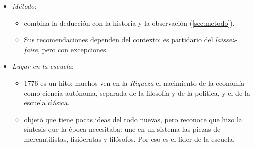 \documentclass[11pt]{article}
\begin{document}
\begin{itemize}
\begin{itemize}
  \item \emph{An Inquiry into the Nature and Causes of the Wealth of Nations}\nocite{Smith1776Wealth}, en 5~libros: el 1.º, sobre la división del trabajo, el valor y el reparto; el 2.º, sobre el capital; el 3.º, sobre la historia del progreso de la riqueza; el 4.º, sobre la crítica del mercantilismo y de los fisiócratas, y el 5.º, sobre las finanzas del Estado.
  \end{itemize}
\item \emph{Método}:
  \begin{itemize}
  \item {} combina la deducción con la historia y la observación (\ref{sec:metodo}).
  \item Sus recomendaciones dependen del contexto: es partidario del \emph{laissez-faire}, pero con excepciones.
  \end{itemize}
\item \emph{Lugar en la escuela}:
  \begin{itemize}
  \item 1776 es un hito: muchos ven en la \emph{Riqueza} el nacimiento de la economía como ciencia autónoma, separada de la filosofía y de la política, y el de la escuela clásica.
  \item {} objetó que tiene pocas ideas del todo nuevas, pero reconoce que hizo la síntesis que la época necesitaba: une en un sistema las piezas de mercantilistas, fisiócratas y filósofos\nocite{Schumpeter1954History}. Por eso es el líder de la escuela.
  \end{itemize}
\end{itemize}
\end{document}
